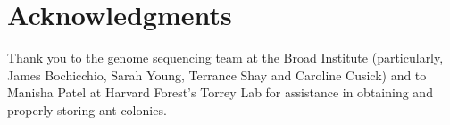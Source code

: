 \documentclass[fleqn,10pt,lineno]{wlpeerj} %
\begin{document}
\section*{Acknowledgments}

Thank you to the genome sequencing team at the Broad Institute
(particularly, James Bochicchio, Sarah Young, Terrance Shay and
Caroline Cusick) and to Manisha Patel at Harvard Forest's Torrey Lab
for assistance in obtaining and properly storing ant colonies.




\newpage
\clearpage







\end{document}
